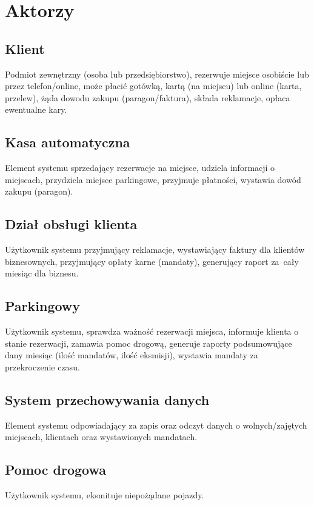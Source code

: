 \newpage
\section{Aktorzy}
\subsection{Klient}

Podmiot zewnętrzny (osoba lub przedsiębiorstwo), rezerwuje miejsce osobiście lub przez telefon/online, może płacić gotówką, kartą (na miejscu) lub online (karta, przelew), żąda dowodu zakupu (paragon/faktura), składa reklamacje,  opłaca ewentualne kary.

\subsection{Kasa automatyczna}

Element systemu sprzedający rezerwacje na miejsce, udziela informacji o miejscach, przydziela miejsce parkingowe, przyjmuje płatności, wystawia dowód zakupu (paragon).

\subsection{Dział obsługi klienta}

Użytkownik systemu przyjmujący reklamacje, wystawiający faktury dla klientów biznesownych,  przyjmujący opłaty karne (mandaty), generujący raport za~cały miesiąc dla biznesu.

\subsection{Parkingowy}

Użytkownik systemu, sprawdza ważność rezerwacji miejsca, informuje klienta o stanie rezerwacji, zamawia pomoc drogową, generuje raporty podsumowujące dany miesiąc (ilość mandatów, ilość eksmisji), wystawia mandaty za przekroczenie czasu.

\subsection{System przechowywania danych}

Element systemu odpowiadający za zapis oraz odczyt danych o wolnych/zajętych miejscach, klientach oraz wystawionych mandatach.

\subsection{Pomoc drogowa}

Użytkownik systemu, eksmituje niepożądane pojazdy.